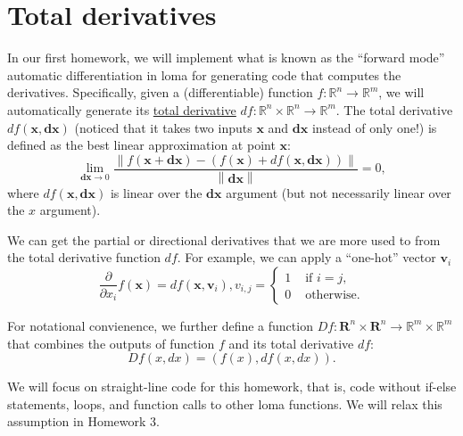 




\section{Total derivatives}

In our first homework, we will implement what is known as the ``forward mode'' automatic differentiation in loma for generating code that computes the derivatives. 
Specifically, given a (differentiable) function $f: \mathbb{R}^n \rightarrow \mathbb{R}^m$, we will automatically generate its \href{https://en.wikipedia.org/wiki/Total_derivative}{total derivative} $df: \mathbb{R}^n \times \mathbb{R}^n \rightarrow \mathbb{R}^m$. 
The total derivative $df(\mathbf{x}, \mathbf{dx})$ (noticed that it takes two inputs $\mathbf{x}$ and $\mathbf{dx}$ instead of only one!) is defined as the best linear approximation at point $\mathbf{x}$:
\begin{equation}
\lim_{\mathbf{dx} \rightarrow 0} \frac{\left\|f(\mathbf{x} + \mathbf{dx}) - \left(f(\mathbf{x}) + df(\mathbf{x}, \mathbf{dx})\right)\right\|}{\left\|\mathbf{dx}\right\|} = 0,
\label{eq:totalderiv}
\end{equation}
where $df(\mathbf{x}, \mathbf{dx})$ is linear over the $\mathbf{dx}$ argument (but not necessarily linear over the $x$ argument).

We can get the partial or directional derivatives that we are more used to from the total derivative function $df$. For example, we can apply a ``one-hot'' vector $\mathbf{v}_i$ 
\begin{equation}
\frac{\partial}{\partial x_i} f(\mathbf{x}) = df(\mathbf{x}, \mathbf{v}_i), v_{i,j} = \begin{cases}
1 & \text{ if } i = j, \\
0 & \text{ otherwise}.
\end{cases}
\end{equation}

For notational convienence, we further define a function $Df: \mathbf{R}^n \times \mathbf{R}^n \rightarrow \mathbb{R}^m \times \mathbb{R}^m$ that combines the outputs of function $f$ and its total derivative $df$:
\begin{equation}
Df(x, dx) = \left(f(x), df(x, dx)\right).
\end{equation}

We will focus on straight-line code for this homework, that is, code without if-else statements, loops, and function calls to other loma functions. We will relax this assumption in Homework 3. 

